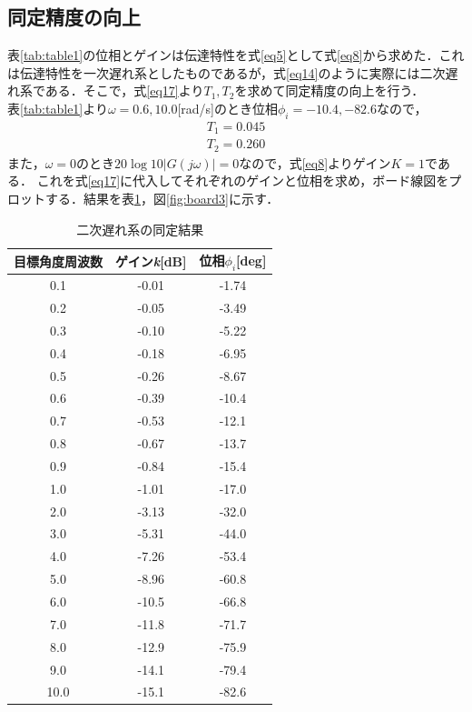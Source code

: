 \documentclass{jsarticle}
\begin{document}
  \subsection{同定精度の向上}
  表\ref{tab:table1}の位相とゲインは伝達特性を式\ref{eq5}として式\ref{eq8}から求めた．これは伝達特性を一次遅れ系としたものであるが，式\ref{eq14}のように実際には二次遅れ系である．そこで，式\ref{eq17}より$T_1,T_2$を求めて同定精度の向上を行う． \\
表\ref{tab:table1}より$\omega  = 0.6 , 10.0$[rad/s]のとき位相$\phi_i = -10.4,-82.6$なので，
\begin{eqnarray*}
 T_1 = 0.045\\ 
 T_2 = 0.260
\end{eqnarray*}
また，$\omega = 0$のとき$20\log{10} |G(j\omega)| = 0$なので，式\ref{eq8}よりゲイン$K = 1$である．
これを式\ref{eq17}に代入してそれぞれのゲインと位相を求め，ボード線図をプロットする．結果を表\ref{table3}，図\ref{fig:board3}に示す．
  
\begin{table}[h]
 \begin{center}
  \caption{二次遅れ系の同定結果}
  \begin{tabular}{|c|c|c|} \hline
   目標角度周波数 & ゲイン{\it k}[dB] & 位相$\phi_i$[deg]\\ \hline \hline
   0.1 & -0.01 & -1.74 \\ \hline
   0.2 & -0.05 & -3.49 \\ \hline
   0.3 & -0.10 & -5.22 \\ \hline
   0.4 & -0.18 & -6.95 \\ \hline
   0.5 & -0.26 & -8.67 \\ \hline
   0.6 & -0.39 & -10.4 \\ \hline
   0.7 & -0.53 & -12.1 \\ \hline
   0.8 & -0.67 & -13.7 \\ \hline
   0.9 & -0.84 & -15.4 \\ \hline
   1.0 & -1.01 & -17.0 \\ \hline
   2.0 & -3.13 & -32.0 \\ \hline
   3.0 & -5.31 & -44.0 \\ \hline
   4.0 & -7.26 & -53.4 \\ \hline
   5.0 & -8.96 & -60.8 \\ \hline
   6.0 & -10.5 & -66.8 \\ \hline
   7.0 & -11.8 & -71.7 \\ \hline
   8.0 & -12.9 & -75.9 \\ \hline
   9.0 & -14.1 & -79.4 \\ \hline
   10.0 & -15.1 & -82.6 \\ \hline
  \end{tabular}
  \label{table3}
 \end{center}
\end{table}
\end{document}
